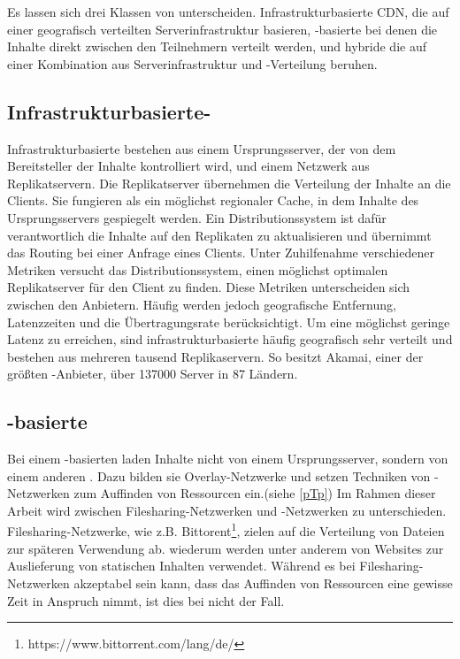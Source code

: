 Es lassen sich drei Klassen von \cdns unterscheiden. Infrastrukturbasierte CDN, die auf einer geografisch verteilten Serverinfrastruktur basieren, \pTp-basierte \cdns bei denen die Inhalte direkt zwischen den Teilnehmern verteilt werden, und hybride \cdns die auf einer Kombination aus Serverinfrastruktur und \pTp-Verteilung beruhen.

\subsection{Infrastrukturbasierte-\cdns}
Infrastrukturbasierte \cdns bestehen aus einem Ursprungsserver, der von dem Bereitsteller der Inhalte kontrolliert wird, und einem Netzwerk aus Replikatservern. Die Replikatserver übernehmen die Verteilung der Inhalte an die Clients. Sie fungieren als ein möglichst regionaler Cache, in dem Inhalte des Ursprungsservers gespiegelt werden. Ein Distributionssystem ist dafür verantwortlich die Inhalte auf den Replikaten zu aktualisieren und übernimmt das Routing bei einer Anfrage eines Clients. Unter Zuhilfenahme verschiedener Metriken versucht das Distributionssystem, einen möglichst optimalen Replikatserver für den Client zu finden. Diese Metriken unterscheiden sich zwischen den Anbietern. Häufig werden jedoch geografische Entfernung, Latenzzeiten und die Übertragungsrate berücksichtigt. Um eine möglichst geringe Latenz zu erreichen, sind infrastrukturbasierte \cdns häufig geografisch sehr verteilt und bestehen aus mehreren tausend Replikaservern. So besitzt Akamai, einer der größten \cdn-Anbieter, über 137000 Server in 87 Ländern. \cite{akamaiPeer} 


\subsection{\pTp-basierte \cdns }

Bei einem \pTp-basierten \cdn laden \clients Inhalte nicht von einem Ursprungsserver, sondern von einem anderen \client. Dazu bilden sie Overlay-Netzwerke und setzen Techniken von \pTp-Netzwerken zum Auffinden von Ressourcen ein.(siehe \ref{pTp}) Im Rahmen dieser Arbeit wird zwischen Filesharing-Netzwerken und \cdn-Netzwerken zu unterschieden. Filesharing-Netzwerke, wie z.B. Bittorent\footnote{https://www.bittorrent.com/lang/de/}, zielen auf die Verteilung von Dateien zur späteren Verwendung ab. \cdns wiederum werden unter anderem von Websites zur Auslieferung von statischen Inhalten verwendet. Während es bei Filesharing-Netzwerken akzeptabel sein kann, dass das Auffinden von Ressourcen eine gewisse Zeit in Anspruch nimmt, ist dies bei \cdns nicht der Fall.

